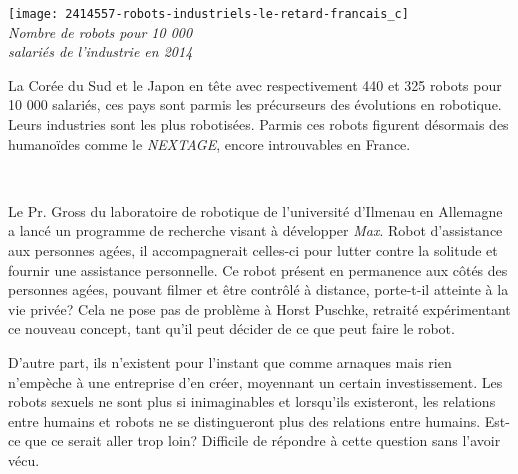 \documentclass[9pt,final,hyphenatedtitles]{papertex}
\begin{document}
\begin{news}{3}
\vspace*{2mm}

\setlength{\fboxsep}{0.3mm}%
\begin{framed}
\hspace*{-5mm}\texttt{[image: 2414557-robots-industriels-le-retard-francais\_c]}\\
\hspace*{9mm}\textit{Nombre de robots pour 10 000\\
\hspace*{8mm} salariés de l'industrie en 2014}\\


\hspace*{-2mm}\parbox{5.4cm}{La Corée du Sud et le Japon en tête avec respectivement 440 et 325 robots pour 10 000 salariés, ces pays sont parmis les précurseurs des évolutions en robotique. Leurs industries sont les plus robotisées. Parmis ces robots figurent désormais des humanoïdes comme le \textit{NEXTAGE}, encore introuvables en France.}\\
\vspace*{2mm}
\end{framed}


Le Pr. Gross du laboratoire de robotique de l'université d'Ilmenau en Allemagne a lancé un programme de recherche visant à développer \textit{Max}. Robot d'assistance aux personnes agées, il accompagnerait celles-ci pour lutter contre la solitude et fournir une assistance personnelle. Ce robot présent en permanence aux côtés des personnes agées, pouvant filmer et être contrôlé à distance, porte-t-il atteinte à la vie privée? Cela ne pose pas de problème à Horst Puschke, retraité expérimentant ce nouveau concept, tant qu'il peut décider de ce que peut faire le robot.

D'autre part, ils n'existent pour l'instant que comme arnaques mais rien n'empèche à une entreprise d'en créer, moyennant un certain investissement. Les robots sexuels ne sont plus si inimaginables et lorsqu'ils existeront, les relations entre humains et robots ne se distingueront plus des relations entre humains. Est-ce que ce serait aller trop loin? Difficile de répondre à cette question sans l'avoir vécu.\end{news}
\end{document}
